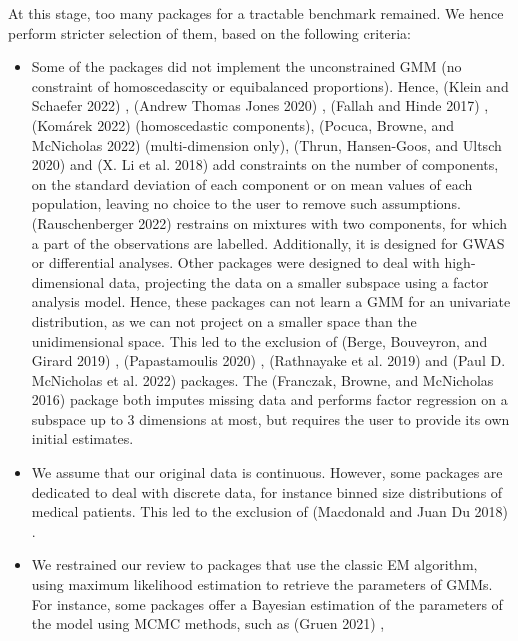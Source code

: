 At this stage, too many packages for a tractable benchmark remained. We
hence perform stricter selection of them, based on the following
criteria:

\begin{itemize}
\item
  Some of the packages did not implement the unconstrained GMM (no
  constraint of homoscedascity or equibalanced proportions). Hence,
   (Klein and Schaefer 2022) , 
  (Andrew Thomas Jones 2020) ,  (Fallah and Hinde 2017) , 
  (Komárek 2022) (homoscedastic components), 
  (Pocuca, Browne, and McNicholas 2022) (multi-dimension only), 
  (Thrun, Hansen-Goos, and Ultsch 2020) and  (X. Li et al. 2018) add
  constraints on the number of components, on the standard deviation
  of each component or on mean values of each population, leaving no
  choice to the user to remove such assumptions. 
  (Rauschenberger 2022) restrains on mixtures with two components, for which a
  part of the observations are labelled. Additionally, it is designed
  for GWAS or differential analyses. Other packages were designed to
  deal with high-dimensional data, projecting the data on a smaller
  subspace using a factor analysis model. Hence, these packages can
  not learn a GMM for an univariate distribution, as we can not
  project on a smaller space than the unidimensional space. This led
  to the exclusion of  (Berge, Bouveyron, and Girard 2019) ,
   (Papastamoulis 2020) ,  (Rathnayake et al. 2019) and
   (Paul D. McNicholas et al. 2022) packages. The 
  (Franczak, Browne, and McNicholas 2016) package both imputes missing data and performs factor
  regression on a subspace up to 3 dimensions at most, but requires
  the user to provide its own initial estimates.
\item
  We assume that our original data is continuous. However, some
  packages are dedicated to deal with discrete data, for instance
  binned size distributions of medical patients. This led to the
  exclusion of  (Macdonald and Juan Du 2018) .
\item
  We restrained our review to packages that use the classic EM
  algorithm, using maximum likelihood estimation to retrieve the
  parameters of GMMs. For instance, some packages offer a Bayesian
  estimation of the parameters of the model using MCMC methods, such
  as  (Gruen 2021) , 

\end{itemize}
